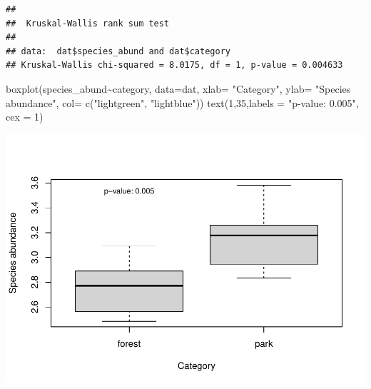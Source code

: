 \documentclass[
]{article}
\newenvironment{Shaded}{\begin{snugshade}}{\end{snugshade}}
\newcommand{\AttributeTok}[1]{\textcolor[rgb]{0.77,0.63,0.00}{#1}}
\newcommand{\CommentTok}[1]{\textcolor[rgb]{0.56,0.35,0.01}{\textit{#1}}}
\newcommand{\DecValTok}[1]{\textcolor[rgb]{0.00,0.00,0.81}{#1}}
\newcommand{\FunctionTok}[1]{\textcolor[rgb]{0.00,0.00,0.00}{#1}}
\newcommand{\NormalTok}[1]{#1}
\newcommand{\SpecialCharTok}[1]{\textcolor[rgb]{0.00,0.00,0.00}{#1}}
\newcommand{\StringTok}[1]{\textcolor[rgb]{0.31,0.60,0.02}{#1}}
\begin{document}
\begin{verbatim}
## 
##  Kruskal-Wallis rank sum test
## 
## data:  dat$species_abund and dat$category
## Kruskal-Wallis chi-squared = 8.0175, df = 1, p-value = 0.004633
\end{verbatim}

\begin{Shaded}
\begin{Highlighting}[]
\FunctionTok{boxplot}\NormalTok{(species\_abund}\SpecialCharTok{\textasciitilde{}}\NormalTok{category, }\AttributeTok{data=}\NormalTok{dat, }\AttributeTok{xlab=} \StringTok{"Category"}\NormalTok{, }\AttributeTok{ylab=} \StringTok{"Species abundance"}\NormalTok{, }\AttributeTok{col=} \FunctionTok{c}\NormalTok{(}\StringTok{"lightgreen"}\NormalTok{, }\StringTok{"lightblue"}\NormalTok{))}
\FunctionTok{text}\NormalTok{(}\DecValTok{1}\NormalTok{,}\DecValTok{35}\NormalTok{,}\AttributeTok{labels =} \StringTok{"p{-}value: 0.005"}\NormalTok{, }\AttributeTok{cex =} \DecValTok{1}\NormalTok{)}
\end{Highlighting}
\end{Shaded}

\includegraphics{birdsdataanalysis_files/figure-latex/unnamed-chunk-5-4.pdf}

\begin{Shaded}
\end{Shaded}
\end{document}
